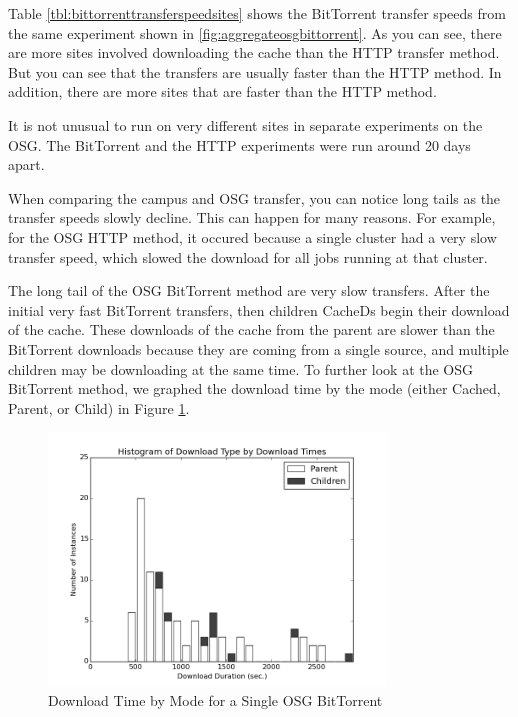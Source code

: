 Table \ref{tbl:bittorrenttransferspeedsites} shows the BitTorrent transfer speeds from the same experiment shown in \ref{fig:aggregateosgbittorrent}.  As you can see, there are more sites involved downloading the cache than the HTTP transfer method.  But you can see that the transfers are usually faster than the HTTP method.  In addition, there are more sites that are faster than the  HTTP method.

It is not unusual to run on very different sites in separate experiments on the OSG.  The BitTorrent and the HTTP experiments were run around 20 days apart.

When comparing the campus and OSG transfer, you can notice long tails as the transfer speeds slowly decline.  This can happen for many reasons.  For example, for the OSG HTTP method, it occured because a single cluster had a very slow transfer speed, which slowed the download for all jobs running at that cluster.

The long tail of the OSG BitTorrent method are very slow transfers.  After the initial very fast BitTorrent transfers,  then children CacheDs begin their download of the cache.  These downloads of the cache from the parent are slower than the BitTorrent downloads because they are coming from a single source, and multiple children may be downloading at the same time.  To further look at the OSG BitTorrent method, we graphed the download time by the mode (either Cached, Parent, or Child) in Figure \ref{fig:dowloadmodebittorrent}.

\begin{figure}[h!t]
\centering
\includegraphics[width=0.8\textwidth]{images/osg-aggregatebittorrentmodes-grayscale.png}
\caption{Download Time by Mode for a Single OSG BitTorrent}
\label{fig:dowloadmodebittorrent}
\end{figure}

